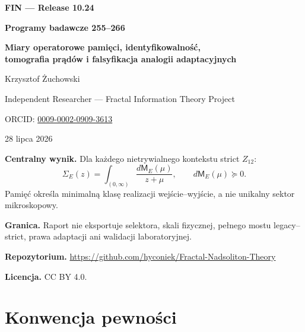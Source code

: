\documentclass[11pt,a4paper,openany]{report}
\begin{document}
\hypersetup{pageanchor=false}
\begin{titlepage}
\centering
\vspace*{11mm}
{\Large\bfseries FIN --- Release 10.24\par}
\vspace{10mm}
{\Huge\bfseries Programy badawcze 255--266\par}
\vspace{5mm}
{\LARGE\bfseries Miary operatorowe pamięci, identyfikowalność,\\
tomografia prądów i falsyfikacja analogii adaptacyjnych\par}
\vspace{16mm}
{\Large Krzysztof \.Zuchowski\par}
\vspace{2mm}
{\normalsize Independent Researcher --- Fractal Information Theory Project\par}
\vspace{2mm}
{\normalsize ORCID: \href{https://orcid.org/0009-0002-0909-3613}{0009-0002-0909-3613}\par}
\vspace{9mm}
{\large 28 lipca 2026\par}
\vfill
\begin{minipage}{0.9\textwidth}
\small
\textbf{Centralny wynik.}
Dla każdego nietrywialnego kontekstu strict \(Z_{12}\):
\[
\Sigma_E(z)=\int_{(0,\infty)}\frac{d\mathsf M_E(\mu)}{z+\mu},
\qquad d\mathsf M_E(\mu)\succeq0.
\]
Pamięć określa minimalną klasę realizacji wejście--wyjście, a nie unikalny
sektor mikroskopowy.

\medskip
\textbf{Granica.}
Raport nie eksportuje selektora, skali fizycznej, pełnego mostu
legacy--strict, prawa adaptacji ani walidacji laboratoryjnej.

\medskip
\textbf{Repozytorium.}
\url{https://github.com/hyconiek/Fractal-Nadsoliton-Theory}

\textbf{Licencja.} CC BY 4.0.
\end{minipage}
\vfill
\end{titlepage}
\hypersetup{pageanchor=true}
\tableofcontents
\clearpage
{}

\chapter*{Konwencja pewności}
\end{document}
